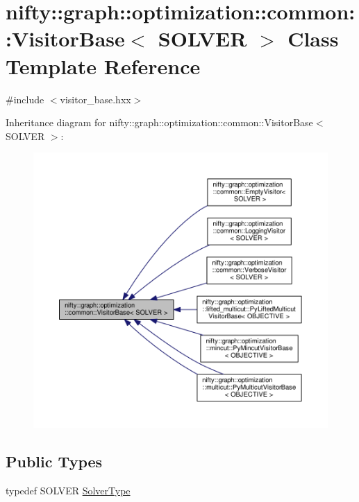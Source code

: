 \hypertarget{classnifty_1_1graph_1_1optimization_1_1common_1_1VisitorBase}{}\section{nifty\+:\+:graph\+:\+:optimization\+:\+:common\+:\+:Visitor\+Base$<$ S\+O\+L\+V\+E\+R $>$ Class Template Reference}
\label{classnifty_1_1graph_1_1optimization_1_1common_1_1VisitorBase}


{\ttfamily \#include $<$visitor\+\_\+base.\+hxx$>$}



Inheritance diagram for nifty\+:\+:graph\+:\+:optimization\+:\+:common\+:\+:Visitor\+Base$<$ S\+O\+L\+V\+E\+R $>$\+:\nopagebreak
\begin{figure}[H]
\begin{center}
\leavevmode
\includegraphics[width=350pt]{classnifty_1_1graph_1_1optimization_1_1common_1_1VisitorBase__inherit__graph}
\end{center}
\end{figure}
\subsection*{Public Types}
\begin{DoxyCompactItemize}
\item 
typedef S\+O\+L\+V\+E\+R \hyperlink{classnifty_1_1graph_1_1optimization_1_1common_1_1VisitorBase_a233e657d5334c972e39a44ac675f6e85}{Solver\+Type}
\end{DoxyCompactItemize}
